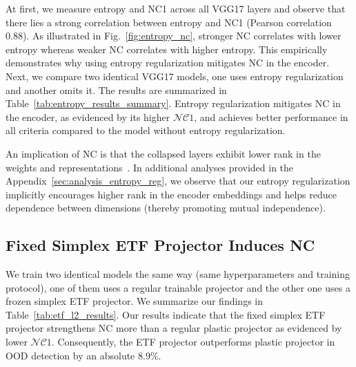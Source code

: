 At first, we measure entropy and NC1 across all VGG17 layers and observe that there lies a strong correlation between entropy and NC1 (Pearson correlation 0.88). As illustrated in Fig.~\ref{fig:entropy_nc}, stronger NC
correlates with lower entropy whereas weaker NC correlates with higher entropy. This empirically demonstrates why using entropy regularization mitigates NC in the encoder. 
Next, we compare two identical VGG17 models, one uses entropy regularization and another omits it. The results are summarized in Table~\ref{tab:entropy_results_summary}. Entropy regularization mitigates NC in the encoder, as evidenced by its higher $\mathcal{NC}1$, and achieves better performance in all criteria compared to the model without entropy regularization. 

An implication of NC is that the collapsed layers exhibit lower rank in the weights and representations~\cite{rangamani2023feature}. In additional analyses provided in the Appendix~\ref{sec:analysis_entropy_reg}, we observe that our entropy regularization implicitly encourages higher rank in the encoder embeddings 
and helps reduce dependence between dimensions (thereby promoting mutual independence).







\subsection{Fixed Simplex ETF Projector Induces NC}





We train two identical models the same way (same hyperparameters and training protocol), one of them uses a regular trainable projector and the other one uses a frozen simplex ETF projector. 
We summarize our findings in Table~\ref{tab:etf_l2_results}. 
Our results indicate that the fixed simplex ETF projector strengthens NC more than a regular plastic projector as evidenced by lower $\mathcal{NC}1$. Consequently, the ETF projector outperforms plastic projector in OOD detection by an absolute 8.9\%. 


